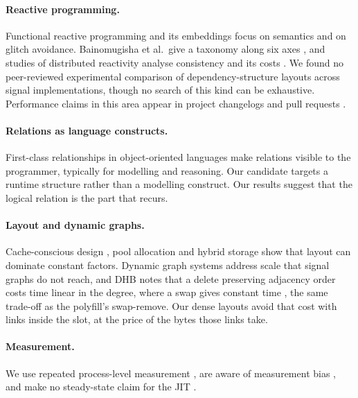 \documentclass[11pt]{article}
\begin{document}
\paragraph{Reactive programming.} Functional reactive programming \cite{elliott1997,elliott2009} and its embeddings \cite{cooper2006,czaplicki2013,salvaneschi2014,maier2013} focus on semantics and on glitch avoidance. Bainomugisha et al.\ give a taxonomy along six axes \cite{bainomugisha2013}, and studies of distributed reactivity analyse consistency and its costs \cite{drechsler2014,margara2018}. We found no peer-reviewed experimental comparison of dependency-structure layouts across signal implementations, though no search of this kind can be exhaustive. Performance claims in this area appear in project changelogs and pull requests \cite{vue10397}.

\paragraph{Relations as language constructs.} First-class relationships in object-oriented languages \cite{rumbaugh1987,bierman2005,balzer2007} make relations visible to the programmer, typically for modelling and reasoning. Our candidate targets a runtime structure rather than a modelling construct. Our results suggest that the logical relation is the part that recurs.

\paragraph{Layout and dynamic graphs.} Cache-conscious design \cite{chilimbi1999,chilimbi1999b}, pool allocation \cite{lattner2005} and hybrid storage \cite{ailamaki2001} show that layout can dominate constant factors. Dynamic graph systems \cite{dhulipala2019,shun2013} address scale that signal graphs do not reach, and DHB notes that a delete preserving adjacency order costs time linear in the degree, where a swap gives constant time \cite{grinten2022}, the same trade-off as the polyfill's swap-remove. Our dense layouts avoid that cost with links inside the slot, at the price of the bytes those links take.

\paragraph{Measurement.} We use repeated process-level measurement \cite{georges2007,kalibera2013}, are aware of measurement bias \cite{mytkowicz2009}, and make no steady-state claim for the JIT \cite{barrett2017}.
\end{document}
